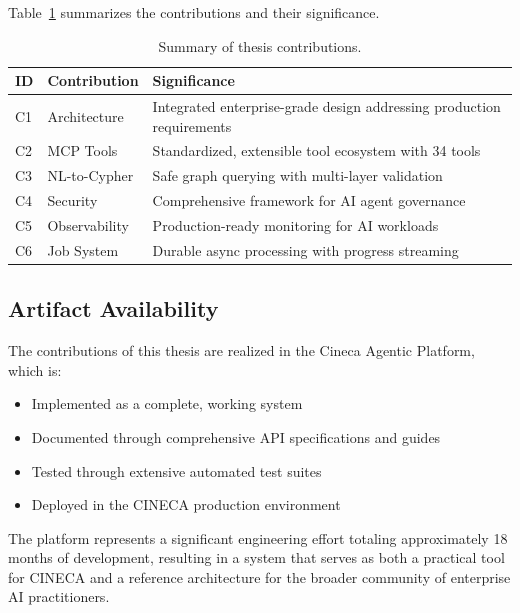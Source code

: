 Table~\ref{tab:contribution-summary} summarizes the contributions and their significance.

\begin{table}[ht]
\centering
\caption{Summary of thesis contributions.}
\label{tab:contribution-summary}
\small
\begin{tabular}{llp{6cm}}
\hline
\textbf{ID} & \textbf{Contribution} & \textbf{Significance} \\
\hline
C1 & Architecture & Integrated enterprise-grade design addressing production requirements \\
C2 & MCP Tools & Standardized, extensible tool ecosystem with 34 tools \\
C3 & NL-to-Cypher & Safe graph querying with multi-layer validation \\
C4 & Security & Comprehensive framework for AI agent governance \\
C5 & Observability & Production-ready monitoring for AI workloads \\
C6 & Job System & Durable async processing with progress streaming \\
\hline
\end{tabular}
\end{table}

\subsection{Artifact Availability}

The contributions of this thesis are realized in the Cineca Agentic Platform, which is:
\begin{itemize}
    \item Implemented as a complete, working system
    \item Documented through comprehensive API specifications and guides
    \item Tested through extensive automated test suites
    \item Deployed in the CINECA production environment
\end{itemize}

The platform represents a significant engineering effort totaling approximately 18 months of development, resulting in a system that serves as both a practical tool for CINECA and a reference architecture for the broader community of enterprise AI practitioners.

